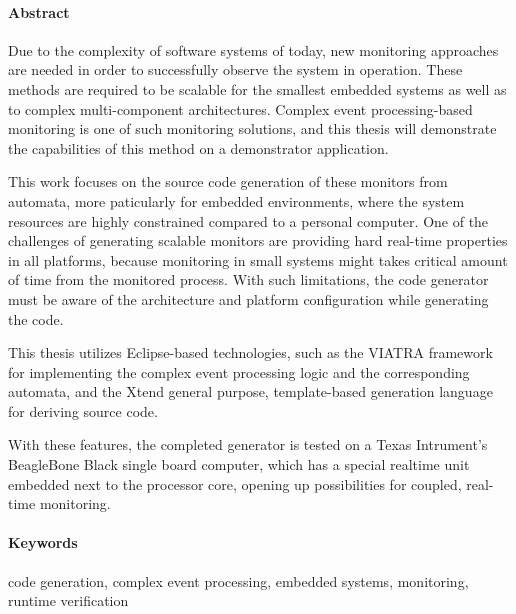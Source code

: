 \paragraph*{Abstract}
\thispagestyle{plain}

Due to the complexity of software systems of today, new monitoring approaches are needed in order to successfully observe the system in operation. These methods are required to be scalable for the smallest embedded systems as well as to complex multi-component architectures. Complex event processing-based monitoring is one of such monitoring solutions, and this thesis will demonstrate the capabilities of this method on a demonstrator application.

This work focuses on the source code generation of these monitors from automata, more paticularly for embedded environments, where the system resources are highly constrained compared to a personal computer. One of the challenges of generating scalable monitors are providing hard real-time properties in all platforms, because monitoring in small systems might takes critical amount of time from the monitored process. With such limitations, the code generator must be aware of the architecture and platform configuration while generating the code.

This thesis utilizes Eclipse-based technologies, such as the VIATRA framework for implementing the complex event processing logic and the corresponding automata, and the Xtend general purpose, template-based generation language for deriving source code.

With these features, the completed generator is tested on a Texas Intrument's BeagleBone Black single board computer, which has a special realtime unit embedded next to the processor core, opening up possibilities for coupled, real-time monitoring.

\paragraph{Keywords} code generation, complex event processing, embedded systems, monitoring, runtime verification
